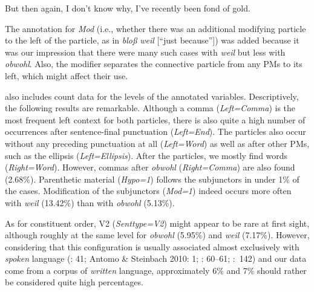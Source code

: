 \begin{styleMoutonExampleTrans}
But then again, I don’t know why, I’ve recently been fond of gold.
\end{styleMoutonExampleTrans}

\begin{styleMoutonTextAfterExample}
The annotation for \textit{Mod} (i.e., whether there was an additional modifying particle to the left of the particle, as in \textit{bloß} \textit{weil} [“just because”]) was added because it was our impression that there were many such cases with \textit{weil} but less with \textit{obwohl}. Also, the modifier separates the connective particle from any PMs to its left, which might affect their use.
\end{styleMoutonTextAfterExample}

\begin{styleMoutonText}
 also includes count data for the levels of the annotated variables. Descriptively, the following results are remarkable. Although a comma (\textit{Left=Comma}) is the most frequent left context for both particles, there is also quite a high number of occurrences after sentence-final punctuation (\textit{Left=End}). The particles also occur without any preceding punc\-tuation at all (\textit{Left=Word}) as well as after other PMs, such as the ellipsis (\textit{Left=Ellipsis}). After the particles, we mostly find words (\textit{Right=Word}). However, commas after \textit{obwohl} (\textit{Right=Comma}) are also found (2.68\%). Parenthetic material (\textit{Hypo=1}) follows the subjunc\-tors in under 1\% of the cases. Modification of the subjunctors (\textit{Mod=1}) indeed occurs more often with \textit{weil} (13.42\%) than with \textit{obwohl} (5.13\%).
\end{styleMoutonText}

\begin{styleMoutonText}
As for constituent order, V2 (\textit{Sent\-type=V2}) might appear to be rare at first sight, although roughly at the same level for \textit{obwohl} (5.95\%) and \textit{weil} (7.17\%). However, considering that this configuration is usually associated almost exclusively with \textit{spoken} language (\citealt{GohlGünthner1999}: 41; Antomo \& Stein\-bach 2010: 1; \citealt{Freywald2010}: 60–61; \citealt{Schwitalla2012}:~142) and our data come from a corpus of \textit{written} lan\-guage, approximately 6\% and 7\% should rather be considered quite high percent\-ages.
\end{styleMoutonText}

